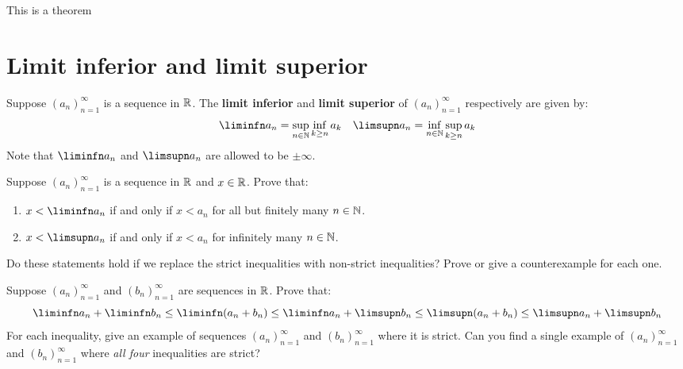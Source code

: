 \documentclass{article}
\begin{document}
\begin{theorem}\label{lookatme}
    This is a theorem
\end{theorem}


\newpage
\section{Limit inferior and limit superior}

\begin{definition}
    Suppose $(a_n)_{n=1}^\infty$ is a sequence in $\R$. The \textbf{limit inferior} and \textbf{limit superior} of $(a_n)_{n=1}^\infty$ respectively are given by:
    \begin{align*}
        \liminfn a_n = \sup_{n\in\N} \inf_{k\ge n} a_k && \limsupn a_n = \inf_{n\in\N} \sup_{k\ge n} a_k
    \end{align*}
    Note that $\liminfn a_n$ and $\limsupn a_n$ are allowed to be $\pm\infty$.
\end{definition}

\begin{exercise}
    Suppose $(a_n)_{n=1}^\infty$ is a sequence in $\R$ and $x\in\R$. Prove that:
    \begin{enumerate}
        \item $x<\liminfn a_n$ if and only if $x<a_n$ for all but finitely many $n\in\N$.
        \item $x<\limsupn a_n$ if and only if $x<a_n$ for infinitely many $n\in\N$.
    \end{enumerate}
    Do these statements hold if we replace the strict inequalities with non-strict inequalities? Prove or give a counterexample for each one.
\end{exercise}

\begin{exercise}\label{liminf_limsup_inequalities}
    Suppose $(a_n)_{n=1}^\infty$ and $(b_n)_{n=1}^\infty$ are sequences in $\R$. Prove that:
    \begin{equation*}
        \liminfn a_n + \liminfn b_n
        \le \liminfn (a_n+b_n)
        \le \liminfn a_n + \limsupn b_n
        \le \limsupn (a_n+b_n)
        \le \limsupn a_n + \limsupn b_n
    \end{equation*}
    For each inequality, give an example of sequences $(a_n)_{n=1}^\infty$ and $(b_n)_{n=1}^\infty$ where it is strict. Can you find a single example of $(a_n)_{n=1}^\infty$ and $(b_n)_{n=1}^\infty$ where \emph{all four} inequalities are strict?
\end{exercise}
\end{document}
